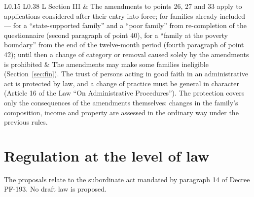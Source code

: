 \documentclass[14pt,a4paper]{extarticle}
\begin{document}
\begin{longtable}{L{0.15\linewidth} L{0.38\linewidth} L{\tabcolsep}}
Section III & The amendments to points 26, 27 and 33 apply to applications considered after their entry into force; for families already included — for a “state-supported family” and a “poor family” from re-completion of the questionnaire (second paragraph of point 40), for a “family at the poverty boundary” from the end of the twelve-month period (fourth paragraph of point 42); until then a change of category or removal caused solely by the amendments is prohibited & The amendments may make some families ineligible (Section~\ref{sec:fin}). The trust of persons acting in good faith in an administrative act is protected by law, and a change of practice must be general in character (Article 16 of the Law “On Administrative Procedures”\cite{apl}). The protection covers only the consequences of the amendments themselves: changes in the family’s composition, income and property are assessed in the ordinary way under the previous rules.\\
\bottomrule
\end{longtable}\endgroup

\section{Regulation at the level of law}
The proposals relate to the subordinate act mandated by paragraph 14 of Decree PF-193. No draft law is proposed.
\end{document}
